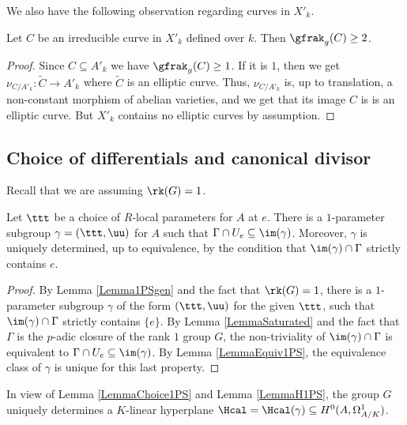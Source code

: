 We also have the following observation regarding curves in $X'_k$.

\begin{lemma}
\notready\label{LemmaGenus2} Let $C$ be an irreducible curve in $X'_k$ defined over $k$. Then $\gfrak_g(C)\ge 2$.
\end{lemma}
\begin{proof} Since $C\subseteq A'_k$ we have $\gfrak_g(C)\ge 1$. If it is $1$, then we get $\nu_{C/A'_k}:\widetilde{C}\to A'_k$ where $\widetilde{C}$ is an elliptic curve. Thus, $\nu_{C/A'_k}$ is, up to translation, a non-constant morphism of abelian varieties, and we get that its image $C$ is is an elliptic curve. But $X'_k$ contains no elliptic curves by assumption.
\end{proof}



\subsection{Choice of differentials and canonical divisor} \label{SecChoiceDiff} Recall that  we are assuming $\rk(G)=1$.

\begin{lemma}
\notready\label{LemmaChoice1PS} Let $\ttt$ be a choice of $R$-local parameters for $A$ at $e$. There is a $1$-parameter subgroup $\gamma=(\ttt,\uu)$ for $A$ such that $\Gamma\cap U_e\subseteq \im(\gamma)$. Moreover, $\gamma$ is uniquely determined, up to equivalence, by the condition that $\im(\gamma)\cap \Gamma$ strictly contains $e$.
\end{lemma}
\begin{proof} By Lemma \ref{Lemma1PSgen} and the fact that $\rk(G)=1$,  there is a $1$-parameter subgroup $\gamma$ of the form $(\ttt,\uu)$ for the given $\ttt$, such that $\im(\gamma)\cap \Gamma$ strictly contains $\{e\}$. By Lemma \ref{LemmaSaturated} and the fact that $\Gamma$ is the $p$-adic closure of the rank $1$ group $G$, the non-triviality of $\im(\gamma)\cap \Gamma$ is equivalent to $\Gamma\cap U_e\subseteq \im(\gamma)$. By Lemma \ref{LemmaEquiv1PS}, the equivalence class of $\gamma$ is unique for this last property.
\end{proof}


In view of Lemma \ref{LemmaChoice1PS} and Lemma \ref{LemmaH1PS}, the group $G$ uniquely determines a $K$-linear hyperplane $\Hcal=\Hcal(\gamma)\subseteq H^0(A, \Omega^1_{A/K})$.


